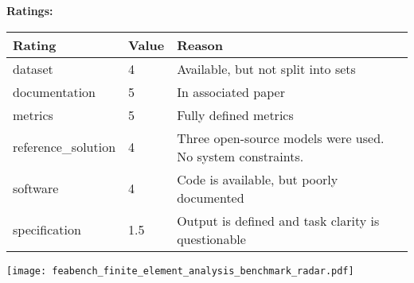 {{{\bf Ratings:} ~ \\

\begin{tabular}{p{} p{} p{}}
\hline
Rating & Value & Reason \\
\hline
dataset & 4 & Available, but not split into sets
 \\
documentation & 5 & In associated paper
 \\
metrics & 5 & Fully defined metrics
 \\
reference\_solution & 4 & Three open-source models were used. No system constraints.
 \\
software & 4 & Code is available, but poorly documented
 \\
specification & 1.5 & Output is defined and task clarity is questionable
 \\
\hline
\end{tabular}

\texttt{[image: feabench\_finite\_element\_analysis\_benchmark\_radar.pdf]}
}}
\clearpage